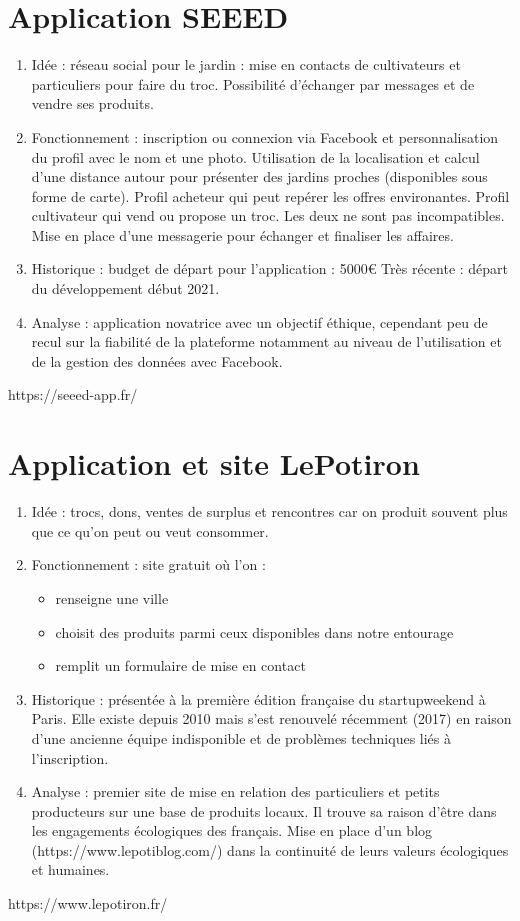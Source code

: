 \documentclass{article}
\begin{document}
\section{Application SEEED}
\begin{enumerate}
    \item Idée : réseau social pour le jardin : mise en contacts de
    cultivateurs et particuliers pour faire du troc. Possibilité 
    d'échanger par messages et de vendre ses produits.
    \item Fonctionnement : inscription ou connexion via Facebook et
    personnalisation du profil avec le nom et une photo.
    Utilisation de la localisation et calcul d'une distance autour
    pour présenter des jardins proches (disponibles sous forme de carte).
    Profil acheteur qui peut repérer les offres environantes.
    Profil cultivateur qui vend ou propose un troc.
    Les deux ne sont pas incompatibles.
    Mise en place d'une messagerie pour échanger et finaliser les affaires.
    \item Historique : budget de départ pour l'application : 5000€
    Très récente : départ du développement début 2021.
    \item Analyse : application novatrice avec un objectif éthique,
    cependant peu de recul sur la fiabilité de la plateforme notamment
    au niveau de l'utilisation et de la gestion des données avec Facebook.
\end{enumerate}
https://seeed-app.fr/ 

\section{Application et site LePotiron} 
\begin{enumerate}
    \item Idée : trocs, dons, ventes de surplus et rencontres car on produit
    souvent plus que ce qu'on peut ou veut consommer.
    \item Fonctionnement : site gratuit où l'on :
    \begin{itemize}
        \item renseigne une ville
        \item choisit des produits parmi ceux disponibles dans notre entourage
        \item remplit un formulaire de mise en contact
    \end{itemize}
        \item Historique : présentée à la première édition française du startupweekend à Paris. Elle existe depuis 2010 mais s'est 
    renouvelé récemment (2017) en raison d'une ancienne équipe indisponible et de problèmes
    techniques liés à l'inscription.
    \item Analyse : premier site de mise en relation des particuliers et petits producteurs sur une base de produits locaux. Il trouve sa raison d'être dans les engagements écologiques des français.
    Mise en place d'un blog (https://www.lepotiblog.com/) dans la continuité
    de leurs valeurs écologiques et humaines.
\end{enumerate}
https://www.lepotiron.fr/
\end{document}
